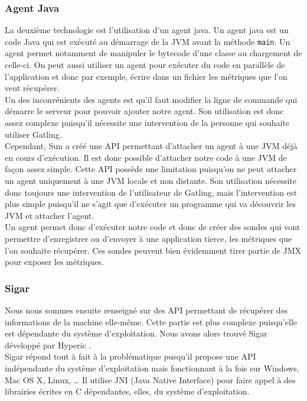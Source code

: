 \subsubsection{Agent Java}

La deuxième technologie est l'utilisation d'un agent java. Un agent java est un code Java qui est exécuté au démarrage de la JVM avant la méthode \verb+main+. Un agent permet notamment de manipuler le bytecode d'une classe au chargement de celle-ci. On peut aussi utiliser un agent pour exécuter du code en parallèle de l'application et donc par exemple, écrire dans un fichier les métriques que l'on veut récupérer.\\

Un des inconvénients des agents est qu'il faut modifier la ligne de commande qui démarre le serveur pour pouvoir ajouter notre agent. Son utilisation est donc assez complexe puisqu'il nécessite une intervention de la personne qui souhaite utiliser Gatling.\\

Cependant, Sun a créé une API permettant d'attacher un agent à une JVM déjà en cours d'exécution. Il est donc possible d'attacher notre code à une JVM de façon assez simple. Cette API possède une limitation puisqu'on ne peut attacher un agent uniquement à une JVM locale et non distante. Son utilisation nécessite donc toujours une intervention de l'utilisateur de Gatling, mais l'intervention est plus simple puisqu'il ne s'agit que d'exécuter un programme qui va découvrir les JVM et attacher l'agent.\\

Un agent permet donc d'exécuter notre code et donc de créer des sondes qui vont permettre d'enregistrer ou d'envoyer à une application tierce, les métriques que l'on souhaite récupérer. Ces sondes peuvent bien évidemment tirer partie de JMX pour exposer les métriques.

\subsubsection{Sigar}

Nous nous sommes ensuite renseigné sur des API permettant de récupérer des informations de la machine elle-même. Cette partie est plus complexe puisqu'elle est dépendante du système d'exploitation. Nous avons alors trouvé Sigar développé par Hyperic \cite{sigar}.\\

Sigar répond tout à fait à la problématique pusqu'il propose une API indépendante du système d'exploitation mais fonctionnant à la fois sur Windows, Mac OS X, Linux, \dots{} Il utilise JNI (Java Native Interface) pour faire appel à des librairies écrites en C dépendantes, elles, du système d'exploitation.\\


